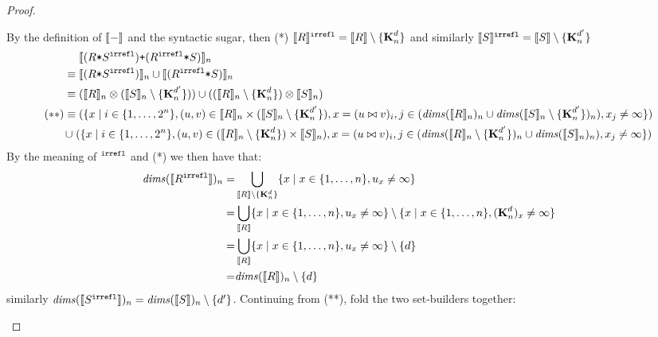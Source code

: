 \begin{proof}
\begin{description}
   By the definition of $\interp{-}$ and the syntactic sugar,
    then (*) $\interp{R}^{\irreflS} = \interp{R} \setminus
   \{\zeroEntry{d}{n}\}$ and similarly $\interp{S}^{\irreflS} =
   \interp{S} \setminus \{\zeroEntry{d'}{n}\}$
   \begin{align*}
    & \; \interp{(R \term{*} S^{\irreflS}) \term{+} (R^{\irreflS}
      \term{*} S)}_n \\
 \equiv & \; \interp{(R \term{*} S^{\irreflS})}_n \cup
          \interp{(R^{\irreflS} \term{*} S)}_n \\
 \equiv & \; (\interp{R}_n \otimes (\interp{S}_n \setminus
         \{\zeroEntry{d'}{n}\}))
   \cup ((\interp{R}_n \setminus \{\zeroEntry{d}{n}\}) \otimes
          \interp{S}_n) \\
(**) \equiv & \; (\{x \mid i \in \{1, \ldots, 2^n\},
                   (u, v) \in \interp{R}_n \times (\interp{S}_n \setminus
         \{\zeroEntry{d'}{n}\}),
                   x = (u \bowtie v)_i,
                   j \in (\effdims{\interp{R}_n}{n} \cup \effdims{\interp{S}_n \setminus
         \{\zeroEntry{d'}{n}\}}{n}),
                   x_j \neq \infty
                  \})
           \\
 \cup \; & (\{x \mid i \in \{1, \ldots, 2^n\},
                   (u, v) \in (\interp{R}_n \setminus
         \{\zeroEntry{d}{n}\}) \times \interp{S}_n),
                   x = (u \bowtie v)_i,
                   j \in (\effdims{\interp{R}_n \setminus
         \{\zeroEntry{d'}{n}\}}{n} \cup \effdims{\interp{S}_n}{n}),
                   x_j \neq \infty
                  \})
   \end{align*}
   By the meaning of $^{\irreflS}$ and (*) we then have that:
   \begin{align*}
    \effdims{\interp{R^\irreflS}}{n} = & \bigcup_{\interp{R} \setminus
   \{\zeroEntry{d}{n}\}}
    \{x \mid x \in \{1, \ldots, n\}, u_x \neq \infty\} \\
     = & \bigcup_{\interp{R}}  \{x \mid x \in \{1, \ldots, n\}, u_x \neq
       \infty\}  \setminus \{x \mid x \in \{1, \ldots, n\},
       (\zeroEntry{d}{n})_x \neq \infty\} \\
     = & \bigcup_{\interp{R}}  \{x \mid x \in \{1, \ldots, n\}, u_x \neq
       \infty\}  \setminus \{d\} \\
     = & \effdims{\interp{R}}{n} \setminus \{d\}
   \end{align*}
   similarly $\effdims{\interp{S^\irreflS}}{n} = \effdims{\interp{S}}{n}
   \setminus \{d'\}$.
   Continuing from (**), fold the two set-builders together:

\end{description}
\end{proof}
